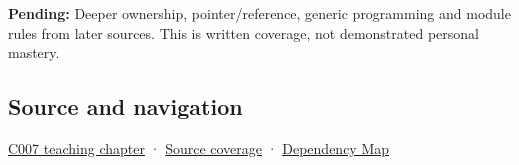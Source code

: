\textbf{Pending:} Deeper ownership, pointer/reference, generic programming and module rules from later sources. This is written coverage, not demonstrated personal mastery.

\subsection{Source and navigation}\label{appendix-b7174c179542-source-and-navigation}

\hyperref[01-foundations-i-ch003-records-acquire-their-initial-state]{C007 teaching chapter} · \hyperref[appendix-fd090d982a15-m007---parts-101-112]{Source coverage} · \hyperref[appendix-4ad47bdd269a]{Dependency Map}
